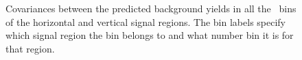 \begin{figure}[hbtp]
  \centering
  \caption{
    Covariances between the predicted background yields in all the \ETg\ bins of the horizontal and vertical signal regions.
    The bin labels specify which signal region the bin belongs to and what number bin it is for that region.}
  \label{fig:correlation_matrix}
\end{figure}
